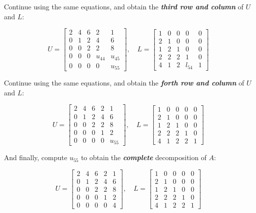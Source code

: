 \documentclass[a4paper,titlepage]{article}
\begin{document}
		Continue using the same equations, and obtain the \textbf{\textit{third row and column}} of $U$ and $L$:
		
		$$
			U = \begin{bmatrix}
				2 & 4 & 6 & 2 & 1\\
				0 & 1 & 2 & 4 & 6\\
				0 & 0 & 2 & 2 & 8\\
				0 & 0 & 0 & u_{44} & u_{45}\\
				0 & 0 & 0 & 0 & u_{55}
			\end{bmatrix}, \quad
			L = \begin{bmatrix}
				1 & 0 & 0 & 0 & 0\\
				2 & 1 & 0 & 0 & 0\\
				1 & 2 & 1 & 0 & 0\\
				2 & 2 & 2 & 1 & 0\\
				4 & 1 & 2 & l_{54} & 1
			\end{bmatrix}
		$$
		
		Continue using the same equations, and obtain the \textbf{\textit{forth row and column}} of $U$ and $L$:
		
		$$
		U = \begin{bmatrix}
		2 & 4 & 6 & 2 & 1\\
		0 & 1 & 2 & 4 & 6\\
		0 & 0 & 2 & 2 & 8\\
		0 & 0 & 0 & 1 & 2\\
		0 & 0 & 0 & 0 & u_{55}
		\end{bmatrix}, \quad
		L = \begin{bmatrix}
		1 & 0 & 0 & 0 & 0\\
		2 & 1 & 0 & 0 & 0\\
		1 & 2 & 1 & 0 & 0\\
		2 & 2 & 2 & 1 & 0\\
		4 & 1 & 2 & 2 & 1
		\end{bmatrix}
		$$
		
		And finally, compute $u_{55}$ to obtain the \textbf{\textit{complete}} decomposition of $A$:
		
		$$
		U = \begin{bmatrix}
		2 & 4 & 6 & 2 & 1\\
		0 & 1 & 2 & 4 & 6\\
		0 & 0 & 2 & 2 & 8\\
		0 & 0 & 0 & 1 & 2\\
		0 & 0 & 0 & 0 & 4
		\end{bmatrix}, \quad
		L = \begin{bmatrix}
		1 & 0 & 0 & 0 & 0\\
		2 & 1 & 0 & 0 & 0\\
		1 & 2 & 1 & 0 & 0\\
		2 & 2 & 2 & 1 & 0\\
		4 & 1 & 2 & 2 & 1
		\end{bmatrix}
		$$
		
\end{document}
